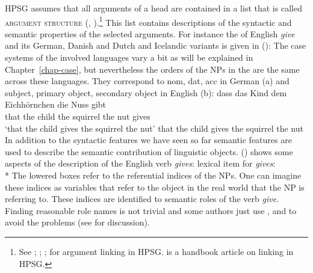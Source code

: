 HPSG assumes that all arguments of a head are contained in a list that is called \textsc{argument
  structure} (\argst, \citealp*{DKW2021a}).\footnote{%
See \citealp[--29]{ps2}; \citealp{Wechsler95a-u};
\citealp{Davis2001a-u}; \citealp[Section~5.6]{MuellerLehrbuch1} for argument
linking in HPSG.  is a handbook article on linking in HPSG.
} This list contains descriptions of the syntactic and semantic properties of
the selected arguments. For instance the \argstl of English \emph{give} and its German, Danish and
Dutch and Icelandic variants is given in ():
\ea
{}
\z
The case systems of the involved languages vary a bit as will be explained in
Chapter~\ref{chap-case}, but nevertheless the orders of the NPs in the \argstl are the same across these
languages. They correspond to nom, dat, acc in German (a) and subject, primary object, secondary object
in English (b):
\eal
\ex 
\gll dass das Kind dem Eichhörnchen die Nuss gibt\\
    that the child  the squirrel    the nut gives\\
\glt `that the child gives the squirrel the nut'
\ex that the child gives the squirrel the nut
\zl
In addition to the syntactic features we have seen so far semantic features are used to describe the
semantic contribution of linguistic objects. () shows some aspects of the description of the English verb
\emph{gives}:
\ea
lexical item for \emph{gives}:\\*
\z
The lowered boxes refer to the referential indices of the NPs. One can imagine these indices as
variables that refer to the object in the real world that the NP is referring to. These indices are
identified to semantic roles of the verb \emph{give}. Finding reasonable role names is not trivial
and some authors just use \argone, \argtwo and \argthree to avoid the problems (see \citealp{Dowty91a}
for discussion).

